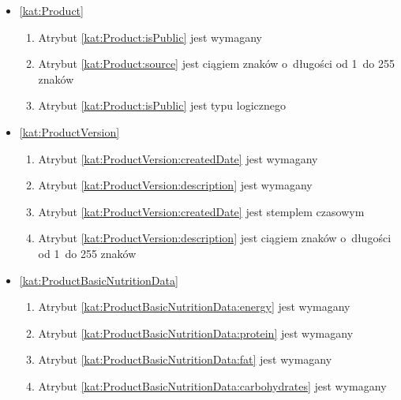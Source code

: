 \begin{itemize}[label={\textbf{Ograniczenia dla}}, wide, labelwidth=!, labelindent=0pt]
    \setlength\itemsep{1.75em}
    \item\ref{kat:Product}\mynobreakpar
    \begin{enumerate}[label={\textbf{OGR/2/\protect\twodigits{\arabic{enumi}}}}, wide, labelwidth=!, align=left, leftmargin=3cm]
        \item Atrybut \ref{kat:Product:isPublic} jest wymagany

        \item Atrybut \ref{kat:Product:source} jest ciągiem znaków o~długości od 1~do 255 znaków
        \item Atrybut \ref{kat:Product:isPublic} jest typu logicznego
    \end{enumerate}

    \item\ref{kat:ProductVersion}\mynobreakpar
    \begin{enumerate}[label={\textbf{OGR/2/\protect\twodigits{\arabic{enumi}}}}, wide, labelwidth=!, align=left, leftmargin=3cm, resume]
        \item Atrybut \ref{kat:ProductVersion:createdDate} jest wymagany
        \item Atrybut \ref{kat:ProductVersion:description} jest wymagany

        \item Atrybut \ref{kat:ProductVersion:createdDate} jest stemplem czasowym
        \item Atrybut \ref{kat:ProductVersion:description} jest ciągiem znaków o~długości od 1~do 255 znaków
    \end{enumerate}

    \item\ref{kat:ProductBasicNutritionData}\mynobreakpar
    \begin{enumerate}[label={\textbf{OGR/2/\protect\twodigits{\arabic{enumi}}}}, wide, labelwidth=!, align=left, leftmargin=3cm, resume]
        \item Atrybut \ref{kat:ProductBasicNutritionData:energy} jest wymagany
        \item Atrybut \ref{kat:ProductBasicNutritionData:protein} jest wymagany
        \item Atrybut \ref{kat:ProductBasicNutritionData:fat} jest wymagany
        \item Atrybut \ref{kat:ProductBasicNutritionData:carbohydrates} jest wymagany


\end{enumerate}
\end{itemize}
